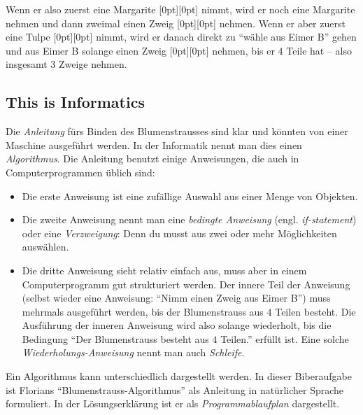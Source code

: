 \documentclass[a4paper,11pt]{report}
\newcommand{\taskGraphicsFolder}{..}
\begin{document}
Wenn er also zuerst eine Margarite \raisebox{\dimexpr -0.5ex -1.0ex \relax}[0pt][0pt]{} nimmt, wird er noch eine Margarite nehmen und dann zweimal einen Zweig \raisebox{\dimexpr -0.5ex -0.5ex \relax}[0pt][0pt]{} nehmen. Wenn er aber zuerst eine Tulpe \raisebox{-0.5ex}[0pt][0pt]{} nimmt, wird er danach direkt zu \enquote{wähle aus Eimer B} gehen und aus Eimer B solange einen Zweig \raisebox{\dimexpr -0.5ex -0.5ex \relax}[0pt][0pt]{} nehmen, bis er $4$ Teile hat – also insgesamt $3$ Zweige nehmen.


\subsection*{This is Informatics}

Die \emph{Anleitung} fürs Binden des Blumenstrausses sind klar und könnten von einer Maschine ausgeführt werden. In der Informatik nennt man dies einen \emph{Algorithmus}. Die Anleitung benutzt einige Anweisungen, die auch in Computerprogrammen üblich sind:

\begin{itemize}
  \item Die erste Anweisung ist eine zufällige Auswahl aus einer Menge von Objekten.
  \item Die zweite Anweisung nennt man eine \emph{bedingte Anweisung} (engl. \emph{if-statement}) oder eine \emph{Verzweigung}: Denn du musst aus zwei oder mehr Möglichkeiten auswählen.
  \item Die dritte Anweisung sieht relativ einfach aus, muss aber in einem Computerprogramm gut strukturiert werden. Der innere Teil der Anweisung (selbst wieder eine Anweisung: \enquote{Nimm einen Zweig aus Eimer B}) muss mehrmals ausgeführt werden, bis der Blumenstrauss aus $4$ Teilen besteht. Die Ausführung der inneren Anweisung wird also solange wiederholt, bis die Bedingung \enquote{Der Blumenstrauss besteht aus $4$ Teilen.} erfüllt ist. Eine solche \emph{Wiederholungs-Anweisung} nennt man auch \emph{Schleife}.
\end{itemize}

Ein Algorithmus kann unterschiedlich dargestellt werden.  In dieser Biberaufgabe ist Florians \enquote{Blumenstrauss-Algorithmus} als Anleitung in natürlicher Sprache formuliert. In der Lösungserklärung ist er als \emph{Programmablaufplan} dargestellt.
\end{document}
